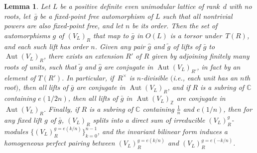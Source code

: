 \documentclass[pdftex]{sigma}
\newcommand{\bC}{\mathbb{C}}
\newcommand{\bZ}{\mathbb{Z}}
\DeclareMathOperator{\Aut}{Aut}
\newtheorem{lem}[thm]{Lemma}
\theoremstyle{definition}
\begin{document}
\begin{lem} \label{lem:fixed-point-free-automorphisms}Let $L$ be a positive definite even unimodular lattice of rank~$d$ with no roots, let~$\bar{g}$ be a fixed-point free automorphism of $L$ such that all nontrivial powers are also fixed-point free, and let $n$ be its order. Then the set of automorphisms $g$ of $(V_L)_R$ that map to $\bar{g}$ in $O(L)$ is a torsor under~$T(R)$, and each such lift has order $n$. Given any pair $\hat{g}$ and $\tilde{g}$ of lifts of $\bar{g}$ to $\Aut (V_L)_R$, there exists an extension $R'$ of $R$ given by adjoining finitely many roots of units, such that $\tilde{g}$ and $\hat{g}$ are conjugate in $\Aut (V_L)_{R'}$, in fact by an element of $T(R')$. In particular, if~$R^\times$ is $n$-divisible $($i.e., each unit has an $n$th root$)$, then all lifts of $\bar{g}$ are conjugate in $\Aut (V_L)_R$, and if $R$ is a subring of $\bC$ containing $e(1/2n)$, then all lifts of $\bar{g}$ in $\Aut (V_L)_\bZ$ are conjugate in $\Aut (V_L)_R$. Finally, if $R$ is a subring of $\bC$ containing $\frac{1}{n}$ and $e(1/n)$, then for any fixed lift $g$ of $\bar{g}$, $(V_L)_R$ splits into a direct sum of irreducible $(V_L)_R^g$-modules $\big\{ (V_L)_R^{g = e(k/n)} \big\}_{k=0}^{n-1}$, and the invariant bilinear form induces a homogeneous perfect pairing between $(V_L)_R^{g = e(k/n)}$ and $(V_L)_R^{g = e(-k/n)}$.
\end{lem}
\end{document}
